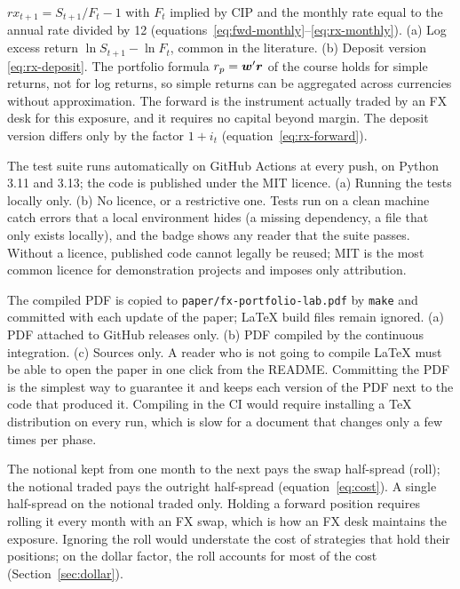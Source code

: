 {$rx_{t+1} = S_{t+1}/F_t - 1$ with $F_t$ implied by CIP and the monthly rate equal to the annual rate divided by 12 (equations~\ref{eq:fwd-monthly}--\ref{eq:rx-monthly}).}
{(a) Log excess return $\ln S_{t+1} - \ln F_t$, common in the literature. (b) Deposit version \eqref{eq:rx-deposit}.}
{The portfolio formula $r_p = \boldsymbol{w}'\boldsymbol{r}$ of the course holds for simple returns, not for log returns, so simple returns can be aggregated across currencies without approximation. The forward is the instrument actually traded by an FX desk for this exposure, and it requires no capital beyond margin. The deposit version differs only by the factor $1+i_t$ (equation~\ref{eq:rx-forward}).}

{The test suite runs automatically on GitHub Actions at every push, on Python 3.11 and 3.13; the code is published under the MIT licence.}
{(a) Running the tests locally only. (b) No licence, or a restrictive one.}
{Tests run on a clean machine catch errors that a local environment hides (a missing dependency, a file that only exists locally), and the badge shows any reader that the suite passes. Without a licence, published code cannot legally be reused; MIT is the most common licence for demonstration projects and imposes only attribution.}

{The compiled PDF is copied to \texttt{paper/fx-portfolio-lab.pdf} by \texttt{make} and committed with each update of the paper; LaTeX build files remain ignored.}
{(a) PDF attached to GitHub releases only. (b) PDF compiled by the continuous integration. (c) Sources only.}
{A reader who is not going to compile \LaTeX{} must be able to open the paper in one click from the README. Committing the PDF is the simplest way to guarantee it and keeps each version of the PDF next to the code that produced it. Compiling in the CI would require installing a TeX distribution on every run, which is slow for a document that changes only a few times per phase.}

{The notional kept from one month to the next pays the swap half-spread (roll); the notional traded pays the outright half-spread (equation~\ref{eq:cost}).}
{A single half-spread on the notional traded only.}
{Holding a forward position requires rolling it every month with an FX swap, which is how an FX desk maintains the exposure. Ignoring the roll would understate the cost of strategies that hold their positions; on the dollar factor, the roll accounts for most of the cost (Section~\ref{sec:dollar}).}

